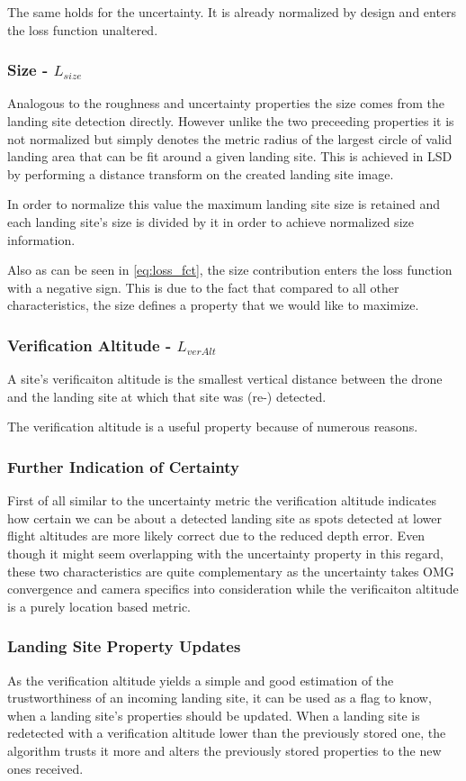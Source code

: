 The same holds for the uncertainty. It is already normalized by design and enters the loss function unaltered.

\subsubsection{Size - $L_{size}$}

Analogous to the roughness and uncertainty properties the size comes from the landing site detection directly. However unlike the two preceeding properties it is not normalized but simply denotes the metric radius of the largest circle of valid landing area that can be fit around a given landing site. This is achieved in LSD by performing a distance transform on the created landing site image.

In order to normalize this value the maximum landing site size is retained and each landing site's size is divided by it in order to achieve normalized size information.

Also as can be seen in \cref{eq:loss_fct}, the size contribution enters the loss function with a negative sign. This is due to the fact that compared to all other characteristics, the size defines a property that we would like to maximize.

\subsubsection{Verification Altitude - $L_{verAlt}$}

A site's verificaiton altitude is the smallest vertical distance between the drone and the landing site at which that site was (re-) detected. 

The verification altitude is a useful property because of numerous reasons.
\subsubsection{Further Indication of Certainty}
First of all similar to the uncertainty metric the verification altitude indicates how certain we can be about a detected landing site as spots detected at lower flight altitudes are more likely correct due to the reduced depth error. Even though it might seem overlapping with the uncertainty property in this regard, these two characteristics are quite complementary as the uncertainty takes OMG convergence and camera specifics into consideration while the verificaiton altitude is a purely location based metric.

\subsubsection{Landing Site Property Updates}
As the verification altitude yields a simple and good estimation of the trustworthiness of an incoming landing site, it can be used as a flag to know, when a landing site's properties should be updated. When a landing site is redetected with a verification altitude lower than the previously stored one, the algorithm trusts it more and alters the previously stored properties to the new ones received.

